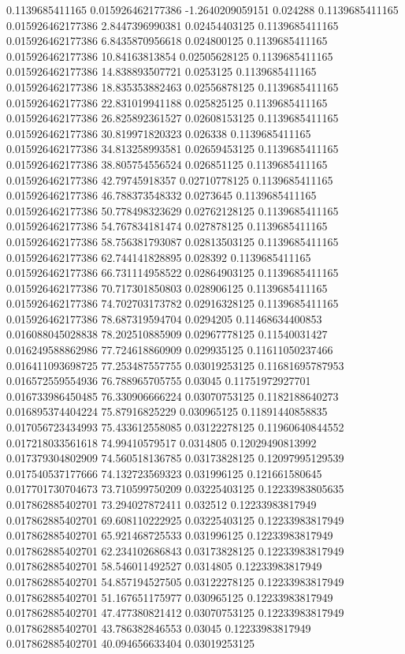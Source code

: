 0.1139685411165 0.015926462177386 -1.2640209059151 0.024288
0.1139685411165 0.015926462177386 2.8447396990381 0.02454403125
0.1139685411165 0.015926462177386 6.8435870956618 0.024800125
0.1139685411165 0.015926462177386 10.84163813854 0.02505628125
0.1139685411165 0.015926462177386 14.838893507721 0.0253125
0.1139685411165 0.015926462177386 18.835353882463 0.02556878125
0.1139685411165 0.015926462177386 22.831019941188 0.025825125
0.1139685411165 0.015926462177386 26.825892361527 0.02608153125
0.1139685411165 0.015926462177386 30.819971820323 0.026338
0.1139685411165 0.015926462177386 34.813258993581 0.02659453125
0.1139685411165 0.015926462177386 38.805754556524 0.026851125
0.1139685411165 0.015926462177386 42.79745918357 0.02710778125
0.1139685411165 0.015926462177386 46.788373548332 0.0273645
0.1139685411165 0.015926462177386 50.778498323629 0.02762128125
0.1139685411165 0.015926462177386 54.767834181474 0.027878125
0.1139685411165 0.015926462177386 58.756381793087 0.02813503125
0.1139685411165 0.015926462177386 62.744141828895 0.028392
0.1139685411165 0.015926462177386 66.731114958522 0.02864903125
0.1139685411165 0.015926462177386 70.717301850803 0.028906125
0.1139685411165 0.015926462177386 74.702703173782 0.02916328125
0.1139685411165 0.015926462177386 78.687319594704 0.0294205
0.11468634400853 0.016088045028838 78.202510885909 0.02967778125
0.11540031427 0.016249588862986 77.724618860909 0.029935125
0.11611050237466 0.016411093698725 77.253487557755 0.03019253125
0.11681695787953 0.016572559554936 76.788965705755 0.03045
0.11751972927701 0.016733986450485 76.330906666224 0.03070753125
0.1182188640273 0.016895374404224 75.87916825229 0.030965125
0.11891440858835 0.017056723434993 75.433612558085 0.03122278125
0.11960640844552 0.017218033561618 74.99410579517 0.0314805
0.12029490813992 0.017379304802909 74.560518136785 0.03173828125
0.12097995129539 0.017540537177666 74.132723569323 0.031996125
0.121661580645 0.017701730704673 73.710599750209 0.03225403125
0.12233983805635 0.017862885402701 73.294027872411 0.032512
0.12233983817949 0.017862885402701 69.608110222925 0.03225403125
0.12233983817949 0.017862885402701 65.921468725533 0.031996125
0.12233983817949 0.017862885402701 62.234102686843 0.03173828125
0.12233983817949 0.017862885402701 58.546011492527 0.0314805
0.12233983817949 0.017862885402701 54.857194527505 0.03122278125
0.12233983817949 0.017862885402701 51.167651175977 0.030965125
0.12233983817949 0.017862885402701 47.477380821412 0.03070753125
0.12233983817949 0.017862885402701 43.786382846553 0.03045
0.12233983817949 0.017862885402701 40.094656633404 0.03019253125
